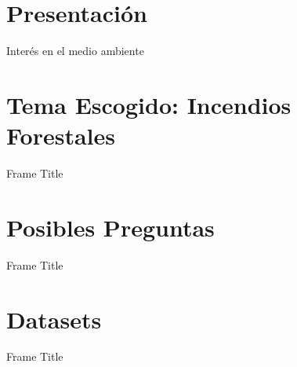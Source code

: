 \section{Presentación}
\begin{frame}{Interés en el medio ambiente}

\end{frame}

\section{Tema Escogido: Incendios Forestales}
\begin{frame}{Frame Title}
    
\end{frame}

\section{Posibles Preguntas}
\begin{frame}{Frame Title}
    
\end{frame}

\section{Datasets}
\begin{frame}{Frame Title}
    
\end{frame}

